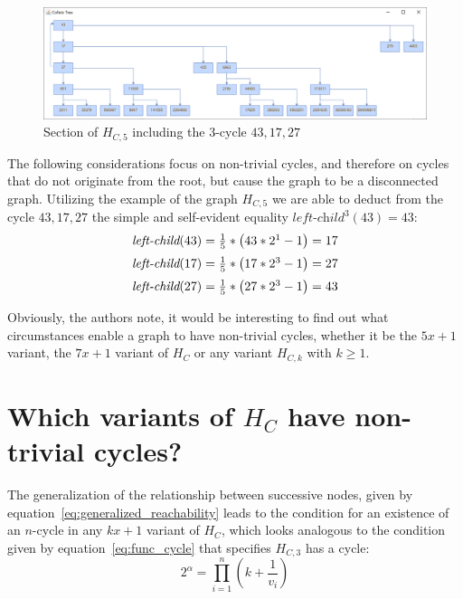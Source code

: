 \begin{figure}
	\includegraphics[width=1.00\textwidth]{figures/h_c5a.png}
	\caption{Section of $H_{C,5}$ including the $3$-cycle $43,17,27$}
	\label{fig:5}
\end{figure}

The following considerations focus on non-trivial cycles, and therefore on cycles that do not originate from the root, but cause the graph to be a disconnected graph. Utilizing the example of the graph $H_{C,5}$ we are able to deduct from the cycle $43,17,27$ the simple and self-evident equality $\textit{left-child}^3(43)=43$:
\begin{equation*}
\begin{array}{l}
\textit{left-child}(43)=\frac{1}{5}*\left(43*2^1-1\right)=17
\\[\medskipamount]
\textit{left-child}(17)=\frac{1}{5}*\left(17*2^3-1\right)=27
\\[\medskipamount]
\textit{left-child}(27)=\frac{1}{5}*\left(27*2^3-1\right)=43
\end{array}
\end{equation*}

Obviously, the authors note, it would be interesting to find out what circumstances enable a graph to have non-trivial cycles, whether it be the $5x+1$ variant, the $7x+1$ variant of $H_C$ or any variant $H_{C,k}$ with $k\geq 1$.

\section{\texorpdfstring{Which variants of $H_C$ have non-trivial cycles?}{Which variants of HC have non-trivial cycles?}}
\label{sec:non_trivial_cycles}
The generalization of the relationship between successive nodes, given by equation~\ref{eq:generalized_reachability} leads to the condition for an existence of an $n$-cycle in any $kx+1$ variant of $H_C$, which looks analogous to the condition given by equation~\ref{eq:func_cycle} that specifies $H_{C,3}$ has a cycle:
\begin{equation}
\label{eq:generalized_cycle}
2^\alpha=\prod_{i=1}^{n}\left(k+\frac{1}{v_i}\right)
\end{equation}

